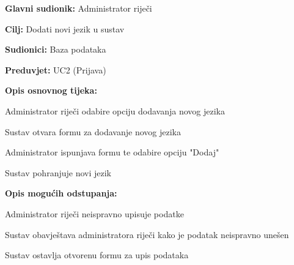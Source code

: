 				\noindent {}
				\begin{packed_item}
					
					\item \textbf{Glavni sudionik: }Administrator riječi
					\item  \textbf{Cilj:} Dodati novi jezik u sustav
					\item  \textbf{Sudionici:} Baza podataka
					\item  \textbf{Preduvjet:} UC2 (Prijava)
					\item  \textbf{Opis osnovnog tijeka:}
					
					\item[] \begin{packed_enum}
						
						\item Administrator riječi odabire opciju dodavanja novog jezika
						\item Sustav otvara formu za dodavanje novog jezika
						\item Administrator ispunjava formu te odabire opciju "Dodaj"
						\item Sustav pohranjuje novi jezik
						
					\end{packed_enum}
					
					\item  \textbf{Opis mogućih odstupanja:}
					
					\item[] \begin{packed_item}
						
						\item[3.a] Administrator riječi neispravno upisuje podatke
						\item[] \begin{packed_enum}
							
							\item Sustav obavještava administratora riječi kako je podatak neispravno unešen
							\item Sustav ostavlja otvorenu formu za upis podataka
							
						\end{packed_enum}
						
						
					\end{packed_item}
				\end{packed_item}
				
